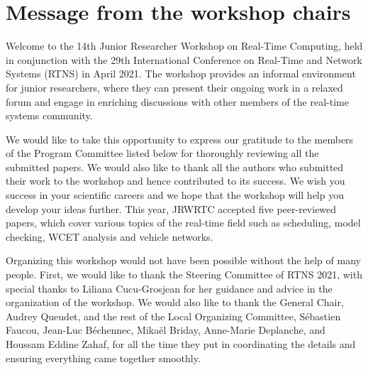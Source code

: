 \documentclass[10pt]{article}
\begin{document}



\newpage



\section*{Message from the workshop chairs}


Welcome to the 14th Junior Researcher Workshop on Real-Time Computing, held in 
conjunction with the 29th International Conference on Real-Time and Network 
Systems (RTNS) in April 2021. The workshop provides an informal 
environment for junior researchers, where they can present their ongoing work 
in a relaxed forum and engage in enriching discussions with other members of 
the real-time systems community.

We would like to take this opportunity to express our gratitude to the members 
of the Program Committee listed below for thoroughly reviewing all the 
submitted papers.  We would also like to thank all the authors who submitted 
their work to the workshop and hence contributed to its success.  We wish you 
success in your scientific careers and we hope that the workshop will help you 
develop your ideas further. This year, JRWRTC accepted five peer-reviewed 
papers,  which cover various topics of the real-time field such as scheduling, 
model checking, WCET analysis and vehicle networks. 


Organizing this workshop would not have been possible 
without the help of many people. First,  we would like to thank the
Steering Committee of RTNS 2021, with special thanks to Liliana 
Cucu-Grosjean for her guidance and advice in 
the organization of the workshop. We would also 
like to thank the General Chair, Audrey Queudet, and the rest of the Local 
Organizing Committee, Sébastien Faucou, Jean-Luc Béchennec,  
Mikaël Briday, Anne-Marie Deplanche, and Houssam Eddine Zahaf, 
for all the time they put in coordinating the details and 
ensuring everything came together smoothly.

\end{document}
